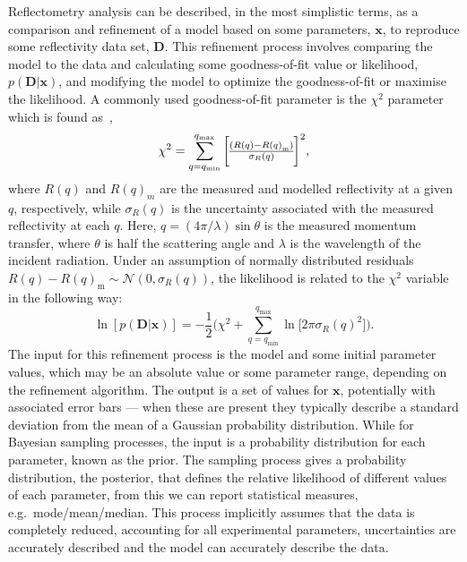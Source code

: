 \documentclass[reprint,superscriptaddress,aps,amsmath]{revtex4-2}
\begin{document}
Reflectometry analysis can be described, in the most simplistic terms, as a comparison and refinement of a model based on some parameters, $\mathbf{x}$, to reproduce some reflectivity data set, $\mathbf{D}$. 
This refinement process involves comparing the model to the data and calculating some goodness-of-fit value or likelihood, $p(\mathbf{D} | \mathbf{x})$, and modifying the model to optimize the goodness-of-fit or maximise the likelihood.
A commonly used goodness-of-fit parameter is the $\chi^2$ parameter which is found as~\cite{nelson_refnx_2019}, 
%
\begin{equation}
    \chi^2 = \sum_{q=q_{\text{min}}}^{q_{\text{max}}}{\bigg{[\frac{(R(q) - R{(q)}_{\text{m}})}{\sigma_R(q)}\bigg]}^2}, 
    \label{equ:chi2}
\end{equation}
%
where $R(q)$ and $R(q)_m$ are the measured and modelled reflectivity at a given $q$, respectively, while $\sigma_{R}(q)$ is the uncertainty associated with the measured reflectivity at each $q$.
Here, $q = (4\pi / \lambda)\sin{\theta}$ is the measured momentum transfer, where $\theta$ is half the scattering angle and $\lambda$ is the wavelength of the incident radiation.
Under an assumption of normally distributed residuals $R(q) - R{(q)}_{\text{m}} \sim \mathcal{N}(0, \sigma_R(q))$, the likelihood is related to the $\chi^2$ variable in the following way:
%
\begin{equation}
    \ln[p(\mathbf{D} | \mathbf{x})] = -\frac{1}{2} \bigg(\chi^2 + \sum_{q=q_{\text{min}}}^{q_{\text{max}}}\ln{\big[2\pi\sigma_R{(q)}^2\big]}\bigg).
    \label{equ:likelihood}
\end{equation}
%
The input for this refinement process is the model and some initial parameter values, which may be an absolute value or some parameter range, depending on the refinement algorithm.
The output is a set of values for $\mathbf{x}$, potentially with associated error bars --- when these are present they typically describe a standard deviation from the mean of a Gaussian probability distribution. 
While for Bayesian sampling processes, the input is a probability distribution for each parameter, known as the prior.
The sampling process gives a probability distribution, the posterior, that defines the relative likelihood of different values of each parameter, from this we can report statistical measures, e.g.\ mode/mean/median.
This process implicitly assumes that the data is completely reduced, accounting for all experimental parameters, uncertainties are accurately described and the model can accurately describe the data. 
\end{document}
